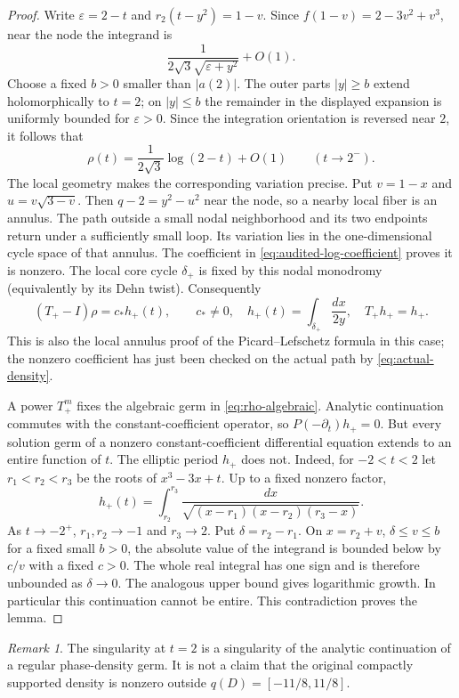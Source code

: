 \documentclass[11pt]{article}
\numberwithin{equation}{section}
\theoremstyle{definition}
\theoremstyle{remark}
\newtheorem{remark}[remark]{Remark}
\begin{document}
\begin{proof}
Write $\varepsilon=2-t$ and $r_2(t-y^2)=1-v$. Since
$f(1-v)=2-3v^2+v^3$, near the node the integrand is
\[
 \frac1{2\sqrt3\sqrt{\varepsilon+y^2}}+O(1).
\]
Choose a fixed $b>0$ smaller than $|a(2)|$. The outer parts
$|y|\ge b$ extend holomorphically to $t=2$; on $|y|\le b$ the remainder
in the displayed expansion is uniformly bounded for $\varepsilon>0$.
Since the integration orientation is reversed near $2$, it follows that
\begin{equation}\label{eq:audited-log-coefficient}
 \rho(t)=\frac{1}{2\sqrt3}\log(2-t)+O(1)
 \qquad(t\to2^-).
\end{equation}
The local geometry makes the corresponding variation precise. Put
$v=1-x$ and $u=v\sqrt{3-v}$. Then $q-2=y^2-u^2$ near the node, so a
nearby local fiber is an annulus. The path outside a small nodal
neighborhood and its two endpoints return under a sufficiently small
loop. Its variation lies in the one-dimensional cycle space of that
annulus. The coefficient in \eqref{eq:audited-log-coefficient} proves it
is nonzero. The local core cycle $\delta_+$ is fixed by this nodal
monodromy (equivalently by its Dehn twist). Consequently
\[
 (T_+-I)\rho=c_*h_+(t),\qquad c_*\ne0,
 \quad h_+(t)=\int_{\delta_+}\frac{dx}{2y},
 \quad T_+h_+=h_+.
\]
This is also the local annulus proof of the Picard--Lefschetz formula in
this case; the nonzero coefficient has just been checked on the actual
path by \eqref{eq:actual-density}.

A power $T_+^m$ fixes the algebraic germ in \eqref{eq:rho-algebraic}.
Analytic continuation commutes with the constant-coefficient operator,
so $P(-\partial_t)h_+=0$.
But every solution germ of a nonzero constant-coefficient differential
equation extends to an entire function of $t$.
The elliptic period $h_+$ does not. Indeed, for $-2<t<2$ let
$r_1<r_2<r_3$ be the roots of $x^3-3x+t$. Up to a fixed nonzero factor,
\[
 h_+(t)=\int_{r_2}^{r_3}
 \frac{dx}{\sqrt{(x-r_1)(x-r_2)(r_3-x)}}.
\]
As $t\to-2^+$, $r_1,r_2\to-1$ and $r_3\to2$. Put
$\delta=r_2-r_1$. On $x=r_2+v$, $\delta\le v\le b$ for a fixed small
$b>0$, the absolute value of the integrand is bounded below by $c/v$
with a fixed $c>0$. The whole real integral has one sign and is therefore
unbounded as $\delta\to0$. The analogous upper bound gives logarithmic
growth. In particular this continuation cannot be entire. This contradiction proves the lemma.
\end{proof}

\begin{remark}
The singularity at $t=2$ is a singularity of the analytic continuation of a
regular phase-density germ. It is not a claim that the original compactly
supported density is nonzero outside $q(D)=[-11/8,11/8]$.
\end{remark}
\end{document}
